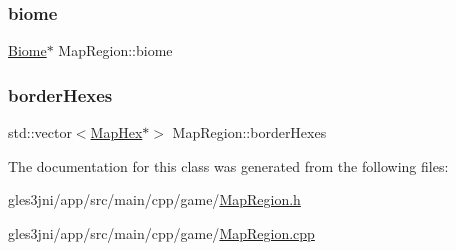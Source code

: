 \subsubsection{\texorpdfstring{biome}{biome}}
{\footnotesize\ttfamily \hyperlink{class_biome}{Biome}$\ast$ Map\+Region\+::biome\hspace{0.3cm}{\ttfamily [private]}}

\mbox{\label{class_map_region_a44514f0c27327dd183d8cdadfbf8eb2b}} 
\subsubsection{\texorpdfstring{border\+Hexes}{borderHexes}}
{\footnotesize\ttfamily std\+::vector$<$\hyperlink{class_map_hex}{Map\+Hex}$\ast$$>$ Map\+Region\+::border\+Hexes\hspace{0.3cm}{\ttfamily [private]}}



The documentation for this class was generated from the following files\+:\begin{DoxyCompactItemize}
\item 
gles3jni/app/src/main/cpp/game/\hyperlink{_map_region_8h}{Map\+Region.\+h}\item 
gles3jni/app/src/main/cpp/game/\hyperlink{_map_region_8cpp}{Map\+Region.\+cpp}\end{DoxyCompactItemize}
